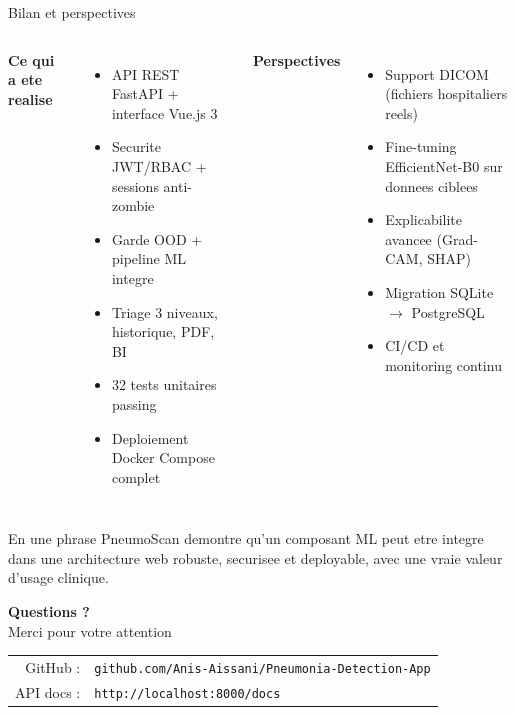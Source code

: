 \documentclass[aspectratio=169,11pt]{beamer}
\begin{document}
\begin{frame}{Bilan et perspectives}
\begin{columns}[T,onlytextwidth]
\textbf{Ce qui a ete realise}
\begin{itemize}
  \item API REST FastAPI + interface Vue.js 3
  \item Securite JWT/RBAC + sessions anti-zombie
  \item Garde OOD + pipeline ML integre
  \item Triage 3 niveaux, historique, PDF, BI
  \item 32 tests unitaires passing
  \item Deploiement Docker Compose complet
\end{itemize}

\textbf{Perspectives}
\begin{itemize}
  \item Support DICOM (fichiers hospitaliers reels)
  \item Fine-tuning EfficientNet-B0 sur donnees ciblees
  \item Explicabilite avancee (Grad-CAM, SHAP)
  \item Migration SQLite $\rightarrow$ PostgreSQL
  \item CI/CD et monitoring continu
\end{itemize}
\end{columns}

\vspace{0.8em}
\begin{block}{En une phrase}
PneumoScan demontre qu'un composant ML peut etre integre dans une
architecture web robuste, securisee et deployable, avec une vraie valeur
d'usage clinique.
\end{block}
\end{frame}

\begin{frame}[plain]
\vspace{3em}
\centering
{\Huge\bfseries\color{accentA} Questions ?}\\[1.2em]
{\large\color{muted} Merci pour votre attention}\\[2em]
\begin{tabular}{r l}
\color{muted}GitHub : & \texttt{github.com/Anis-Aissani/Pneumonia-Detection-App} \\[4pt]
\color{muted}API docs : & \texttt{http://localhost:8000/docs} \\
\end{tabular}
\end{frame}
\end{document}
